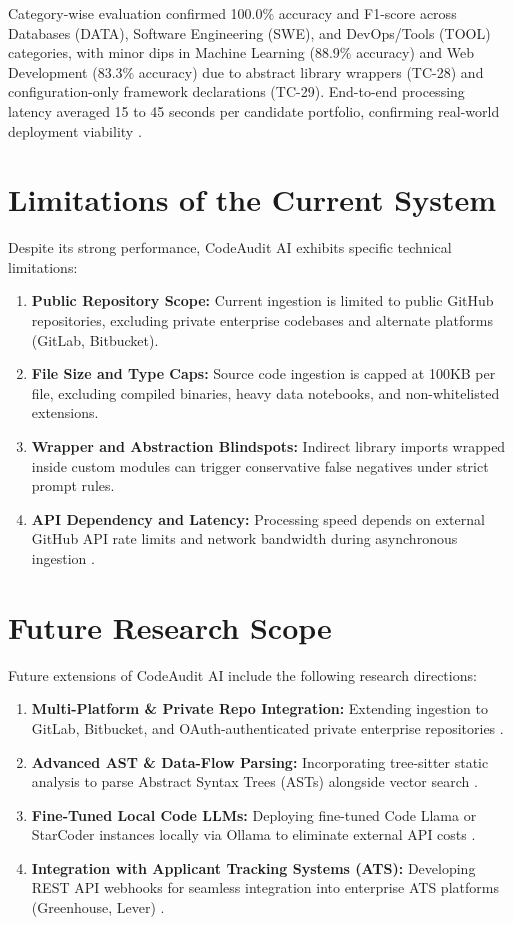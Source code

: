 Category-wise evaluation confirmed 100.0\% accuracy and F1-score across Databases (DATA), Software Engineering (SWE), and DevOps/Tools (TOOL) categories, with minor dips in Machine Learning (88.9\% accuracy) and Web Development (83.3\% accuracy) due to abstract library wrappers (TC-28) and configuration-only framework declarations (TC-29). End-to-end processing latency averaged 15 to 45 seconds per candidate portfolio, confirming real-world deployment viability \cite{ref41}.

\section{Limitations of the Current System}

Despite its strong performance, CodeAudit AI exhibits specific technical limitations:
\begin{enumerate}[leftmargin=*, label=\arabic*.]
    \item \textbf{Public Repository Scope:} Current ingestion is limited to public GitHub repositories, excluding private enterprise codebases and alternate platforms (GitLab, Bitbucket).
    \item \textbf{File Size and Type Caps:} Source code ingestion is capped at 100KB per file, excluding compiled binaries, heavy data notebooks, and non-whitelisted extensions.
    \item \textbf{Wrapper and Abstraction Blindspots:} Indirect library imports wrapped inside custom modules can trigger conservative false negatives under strict prompt rules.
    \item \textbf{API Dependency and Latency:} Processing speed depends on external GitHub API rate limits and network bandwidth during asynchronous ingestion \cite{ref12}.
\end{enumerate}

\section{Future Research Scope}

Future extensions of CodeAudit AI include the following research directions:
\begin{enumerate}[leftmargin=*, label=\arabic*.]
    \item \textbf{Multi-Platform \& Private Repo Integration:} Extending ingestion to GitLab, Bitbucket, and OAuth-authenticated private enterprise repositories \cite{ref12, ref15}.
    \item \textbf{Advanced AST \& Data-Flow Parsing:} Incorporating tree-sitter static analysis to parse Abstract Syntax Trees (ASTs) alongside vector search \cite{ref67, ref8}.
    \item \textbf{Fine-Tuned Local Code LLMs:} Deploying fine-tuned Code Llama or StarCoder instances locally via Ollama to eliminate external API costs \cite{ref70, ref17}.
    \item \textbf{Integration with Applicant Tracking Systems (ATS):} Developing REST API webhooks for seamless integration into enterprise ATS platforms (Greenhouse, Lever) \cite{ref1, ref4}.
\end{enumerate}

